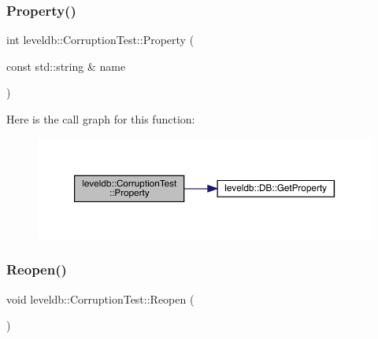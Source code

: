 \subsubsection{\texorpdfstring{Property()}{Property()}}
{\footnotesize\ttfamily int leveldb\+::\+Corruption\+Test\+::\+Property (\begin{DoxyParamCaption}\item[{const std\+::string \&}]{name }\end{DoxyParamCaption})\hspace{0.3cm}{\ttfamily [inline]}}

Here is the call graph for this function\+:
\nopagebreak
\begin{figure}[H]
\begin{center}
\leavevmode
\includegraphics[width=350pt]{classleveldb_1_1_corruption_test_aab1ed767d1cdac7e95a32ccf6defc709_cgraph}
\end{center}
\end{figure}
\mbox{\label{classleveldb_1_1_corruption_test_aa2051faee6b6542d35ebdcf99918a713}} 
\subsubsection{\texorpdfstring{Reopen()}{Reopen()}}
{\footnotesize\ttfamily void leveldb\+::\+Corruption\+Test\+::\+Reopen (\begin{DoxyParamCaption}{ }\end{DoxyParamCaption})\hspace{0.3cm}{\ttfamily [inline]}}

